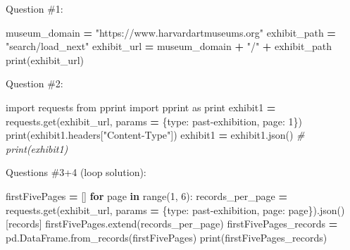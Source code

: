 \documentclass[
]{book}
\newenvironment{Shaded}{\begin{snugshade}}{\end{snugshade}}
\newcommand{\BuiltInTok}[1]{#1}
\newcommand{\CommentTok}[1]{\textcolor[rgb]{0.56,0.35,0.01}{\textit{#1}}}
\newcommand{\ControlFlowTok}[1]{\textcolor[rgb]{0.13,0.29,0.53}{\textbf{#1}}}
\newcommand{\DecValTok}[1]{\textcolor[rgb]{0.00,0.00,0.81}{#1}}
\newcommand{\ImportTok}[1]{#1}
\newcommand{\KeywordTok}[1]{\textcolor[rgb]{0.13,0.29,0.53}{\textbf{#1}}}
\newcommand{\NormalTok}[1]{#1}
\newcommand{\OperatorTok}[1]{\textcolor[rgb]{0.81,0.36,0.00}{\textbf{#1}}}
\newcommand{\StringTok}[1]{\textcolor[rgb]{0.31,0.60,0.02}{#1}}
\begin{document}
\begin{alert}

Question \#1:

\begin{Shaded}
\begin{Highlighting}[]
\NormalTok{museum\_domain }\OperatorTok{=} \StringTok{"https://www.harvardartmuseums.org"}
\NormalTok{exhibit\_path }\OperatorTok{=} \StringTok{"search/load\_next"}
\NormalTok{exhibit\_url }\OperatorTok{=}\NormalTok{ museum\_domain }\OperatorTok{+} \StringTok{"/"} \OperatorTok{+}\NormalTok{ exhibit\_path}
\BuiltInTok{print}\NormalTok{(exhibit\_url)}
\end{Highlighting}
\end{Shaded}

Question \#2:

\begin{Shaded}
\begin{Highlighting}[]
\ImportTok{import}\NormalTok{ requests}
\ImportTok{from}\NormalTok{ pprint }\ImportTok{import}\NormalTok{ pprint }\ImportTok{as} \BuiltInTok{print} 
\NormalTok{exhibit1 }\OperatorTok{=}\NormalTok{ requests.get(exhibit\_url, params }\OperatorTok{=}\NormalTok{ \{}\StringTok{\textquotesingle{}type\textquotesingle{}}\NormalTok{: }\StringTok{\textquotesingle{}past{-}exhibition\textquotesingle{}}\NormalTok{, }\StringTok{\textquotesingle{}page\textquotesingle{}}\NormalTok{: }\DecValTok{1}\NormalTok{\})}
\BuiltInTok{print}\NormalTok{(exhibit1.headers[}\StringTok{"Content{-}Type"}\NormalTok{])}
\NormalTok{exhibit1 }\OperatorTok{=}\NormalTok{ exhibit1.json()}
\CommentTok{\# print(exhibit1)}
\end{Highlighting}
\end{Shaded}

Questions \#3+4 (loop solution):

\begin{Shaded}
\begin{Highlighting}[]
\NormalTok{firstFivePages }\OperatorTok{=}\NormalTok{ []}
\ControlFlowTok{for}\NormalTok{ page }\KeywordTok{in} \BuiltInTok{range}\NormalTok{(}\DecValTok{1}\NormalTok{, }\DecValTok{6}\NormalTok{):}
\NormalTok{    records\_per\_page }\OperatorTok{=}\NormalTok{ requests.get(exhibit\_url, params }\OperatorTok{=}\NormalTok{ \{}\StringTok{\textquotesingle{}type\textquotesingle{}}\NormalTok{: }\StringTok{\textquotesingle{}past{-}exhibition\textquotesingle{}}\NormalTok{, }\StringTok{\textquotesingle{}page\textquotesingle{}}\NormalTok{: page\}).json()[}\StringTok{\textquotesingle{}records\textquotesingle{}}\NormalTok{]}
\NormalTok{    firstFivePages.extend(records\_per\_page)}
\NormalTok{firstFivePages\_records }\OperatorTok{=}\NormalTok{ pd.DataFrame.from\_records(firstFivePages)}
\BuiltInTok{print}\NormalTok{(firstFivePages\_records)}
\end{Highlighting}
\end{Shaded}


\end{alert}
\end{document}
